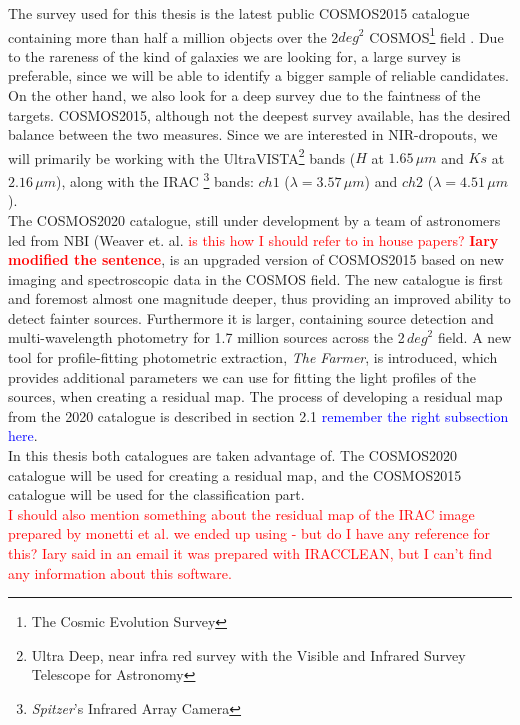 The survey used for this thesis is the latest public COSMOS2015 catalogue containing more than half a million objects over the 2$\si{deg}^2$ COSMOS\footnote{The Cosmic Evolution Survey} field \cite{Laigle_2016}. Due to the rareness of the kind of galaxies we are looking for, a large survey is preferable, since we will be able to identify a bigger sample of reliable candidates. On the other hand, we also look for a deep survey due to the faintness of the targets. COSMOS2015, although not the deepest survey available, has the desired balance between the two measures. Since we are interested in NIR-dropouts, we will primarily be working with the UltraVISTA\footnote{Ultra Deep, near infra red survey with the Visible and Infrared Survey Telescope for Astronomy} bands ($H$ at $1.65\,\si{\mu m}$ and $Ks$ at $2.16\,\si{\mu m}$), along with the IRAC \footnote{\textit{Spitzer}'s Infrared Array Camera} bands: $ch1$ ($\lambda = 3.57\,\si{\mu m}$) and $ch2$ ($\lambda = 4.51\,\si{\mu m}$). \\
The COSMOS2020 catalogue, still under development by a team of astronomers led from NBI (Weaver et. al. \cite{Weaver_2020} \textcolor{red}{is this how I should refer to in house papers? \textbf{Iary modified the sentence}}, is an upgraded version of COSMOS2015 based on new imaging and spectroscopic data in the COSMOS field. The new catalogue is first and foremost almost one magnitude deeper, thus providing an improved ability to detect fainter sources. Furthermore it is larger, containing source detection and multi-wavelength photometry for 1.7 million sources across the 2\,$\si{deg}^2$ field. A new tool for profile-fitting photometric extraction, \textit{The Farmer}, is introduced, which provides additional parameters we can use for fitting the light profiles of the sources, when creating a residual map. The process of developing a residual map from the 2020 catalogue is described in section 2.1 \textcolor{blue}{remember the right subsection here}.\\ 
In this thesis both catalogues are taken advantage of. The COSMOS2020 catalogue will be used for creating a residual map, and the COSMOS2015 catalogue will be used for the classification part. \\
\textcolor{red}{I should also mention something about the residual map of the IRAC image prepared by monetti et al. we ended up using - but do I have any reference for this? Iary said in an email it was prepared with IRACCLEAN, but I can't find any information about this software.}\\


